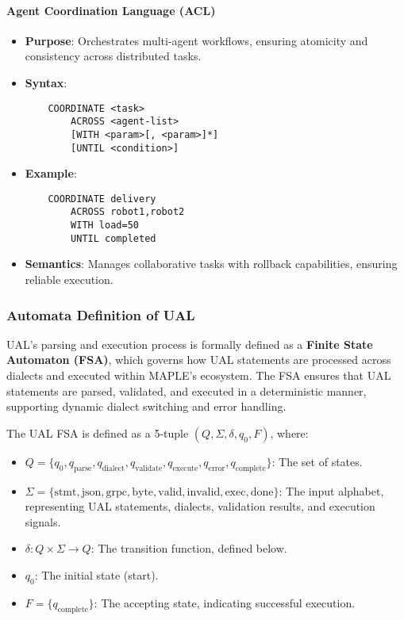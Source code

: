 \documentclass[a4paper,11pt]{article}
\begin{document}
\paragraph{Agent Coordination Language (ACL)}
\begin{itemize}[leftmargin=*]
    \item \textbf{Purpose}: Orchestrates multi-agent workflows, ensuring atomicity and consistency across distributed tasks.
    \item \textbf{Syntax}: 
    \begin{verbatim}
    COORDINATE <task>
        ACROSS <agent-list>
        [WITH <param>[, <param>]*]
        [UNTIL <condition>]
    \end{verbatim}
    \item \textbf{Example}: 
    \begin{verbatim}
    COORDINATE delivery
        ACROSS robot1,robot2
        WITH load=50
        UNTIL completed
    \end{verbatim}
    \item \textbf{Semantics}: Manages collaborative tasks with rollback capabilities, ensuring reliable execution.
\end{itemize}

\subsubsection{Automata Definition of UAL}
UAL’s parsing and execution process is formally defined as a \textbf{Finite State Automaton (FSA)}, which governs how UAL statements are processed across dialects and executed within MAPLE’s ecosystem. The FSA ensures that UAL statements are parsed, validated, and executed in a deterministic manner, supporting dynamic dialect switching and error handling.

The UAL FSA is defined as a 5-tuple \( (Q, \Sigma, \delta, q_0, F) \), where:
\begin{itemize}[leftmargin=*]
    \item \( Q = \{q_0, q_{\text{parse}}, q_{\text{dialect}}, q_{\text{validate}}, q_{\text{execute}}, q_{\text{error}}, q_{\text{complete}}\} \): The set of states.
    \item \( \Sigma = \{\text{stmt}, \text{json}, \text{grpc}, \text{byte}, \text{valid}, \text{invalid}, \text{exec}, \text{done}\} \): The input alphabet, representing UAL statements, dialects, validation results, and execution signals.
    \item \( \delta : Q \times \Sigma \to Q \): The transition function, defined below.
    \item \( q_0 \): The initial state (start).
    \item \( F = \{q_{\text{complete}}\} \): The accepting state, indicating successful execution.
\end{itemize}
\end{document}
